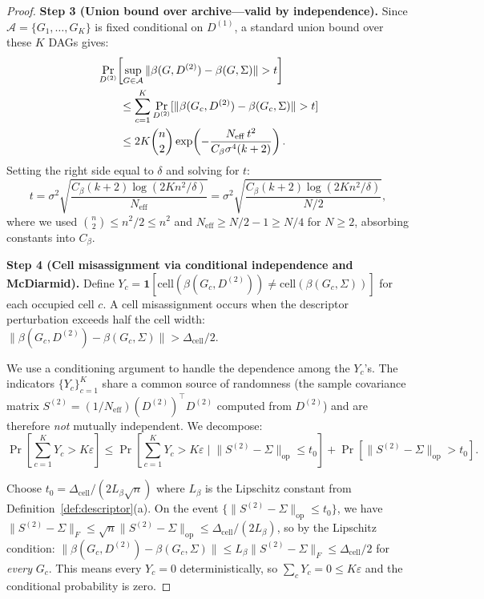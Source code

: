 \documentclass{article}
\theoremstyle{definition}
\theoremstyle{plain}
\theoremstyle{remark}
\begin{document}
\begin{proof}
\textbf{Step 3 (Union bound over archive—valid by independence).}
Since $\mathcal{A} = \{G_1, \ldots, G_K\}$ is fixed conditional on $D^{(1)}$, a standard
union bound over these $K$ DAGs gives:
\begin{align}
  &\Pr_{D^{(2)}}\!\left[\sup_{G \in \mathcal{A}}
  \|\beta(G, D^{(2)}) - \beta(G, \Sigma)\| > t\right] \notag \\
  &\qquad \leq \sum_{c=1}^K \Pr_{D^{(2)}}[\|\beta(G_c, D^{(2)}) - \beta(G_c, \Sigma)\| > t] \\
  &\qquad \leq 2K\binom{n}{2}\exp\!\left(-\frac{N_{\mathrm{eff}} \, t^2}
  {C_\beta\sigma^4(k+2)}\right). \notag
\end{align}
Setting the right side equal to $\delta$ and solving for $t$:
\begin{equation}
  t = \sigma^2\sqrt{\frac{C_\beta(k+2)\log(2Kn^2/\delta)}{N_{\mathrm{eff}}}}
  = \sigma^2\sqrt{\frac{C_\beta(k+2)\log(2Kn^2/\delta)}{N/2}},
\end{equation}
where we used $\binom{n}{2} \leq n^2/2 \leq n^2$ and $N_{\mathrm{eff}} \geq N/2 - 1
\geq N/4$ for $N \geq 2$, absorbing constants into $C_\beta$.

\textbf{Step 4 (Cell misassignment via conditional independence and McDiarmid).}
Define $Y_c = \mathbf{1}[\mathrm{cell}(\beta(G_c, D^{(2)})) \neq
\mathrm{cell}(\beta(G_c, \Sigma))]$ for each occupied cell $c$. A cell misassignment occurs
when the descriptor perturbation exceeds half the cell width:
$\|\beta(G_c, D^{(2)}) - \beta(G_c, \Sigma)\| > \Delta_{\mathrm{cell}}/2$.

We use a conditioning argument to handle the dependence among the $Y_c$'s. The indicators
$\{Y_c\}_{c=1}^K$ share a common source of randomness (the sample covariance matrix
$S^{(2)} = (1/N_{\mathrm{eff}})(D^{(2)})^\top D^{(2)}$ computed from $D^{(2)}$) and are
therefore \emph{not} mutually independent. We decompose:
\begin{equation}
  \Pr\!\left[\sum_{c=1}^K Y_c > K\varepsilon\right]
  \leq \Pr\!\left[\sum_{c=1}^K Y_c > K\varepsilon \;\Big|\;
  \|S^{(2)} - \Sigma\|_{\mathrm{op}} \leq t_0\right]
  + \Pr[\|S^{(2)} - \Sigma\|_{\mathrm{op}} > t_0].
\end{equation}

Choose $t_0 = \Delta_{\mathrm{cell}}/(2L_\beta\sqrt{n})$ where $L_\beta$ is the Lipschitz
constant from Definition~\ref{def:descriptor}(a). On the event
$\{\|S^{(2)} - \Sigma\|_{\mathrm{op}} \leq t_0\}$, we have
$\|S^{(2)} - \Sigma\|_F \leq \sqrt{n}\|S^{(2)} - \Sigma\|_{\mathrm{op}} \leq
\Delta_{\mathrm{cell}}/(2L_\beta)$, so by the Lipschitz condition:
$\|\beta(G_c, D^{(2)}) - \beta(G_c, \Sigma)\| \leq L_\beta \|S^{(2)} - \Sigma\|_F
\leq \Delta_{\mathrm{cell}}/2$ for \emph{every} $G_c$. This means every $Y_c = 0$
deterministically, so $\sum_c Y_c = 0 \leq K\varepsilon$ and the conditional probability
is zero.


\end{proof}
\end{document}
